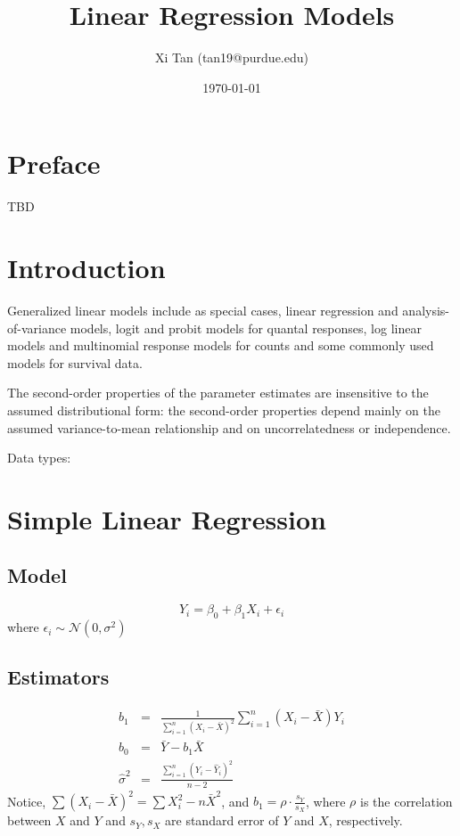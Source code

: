 \documentclass{article}
\title{Linear Regression Models}
\author{Xi Tan (tan19@purdue.edu)}
\date{\today}
\newcommand{\NN}{\mathcal{N}}
\begin{document}
\maketitle
\tableofcontents
\newpage

\section*{Preface}
TBD

\newpage
\section{Introduction}
Generalized linear models include as special cases,  linear regression and analysis-of-variance models, logit and probit models for quantal responses, log linear models and multinomial response models for counts and some commonly used models for survival data.

The second-order properties of the parameter estimates are insensitive to the assumed distributional form: the second-order properties depend mainly on the assumed variance-to-mean relationship and on uncorrelatedness or independence.

Data types:

\newpage
\section{Simple Linear Regression}

\subsection{Model}
\begin{equation}
	Y_i = \beta_0 + \beta_1 X_i + \epsilon_i
\end{equation}
where $\epsilon_i \sim \NN(0,\sigma^2)$

\subsection{Estimators}
\begin{eqnarray}
	b_1 & = & \frac{1}{\sum_{i=1}^n (X_i - \bar X)^2 } \sum_{i=1}^n (X_i-\bar X) Y_i \\
	b_0 & = & \bar Y - b_1 \bar X \\
	\hat \sigma^2 & = & \frac{\sum_{i=1}^n (Y_i - \hat Y_i)^2}{n-2}
\end{eqnarray}
Notice, $\sum(X_i-\bar X)^2 = \sum X_i^2 - n\bar X^2$, and $b_1 = \rho \cdot \frac{s_Y}{s_X}$, where $\rho$ is the correlation between $X$ and $Y$ and $s_Y, s_X$ are standard error of $Y$ and $X$, respectively.
\end{document}
